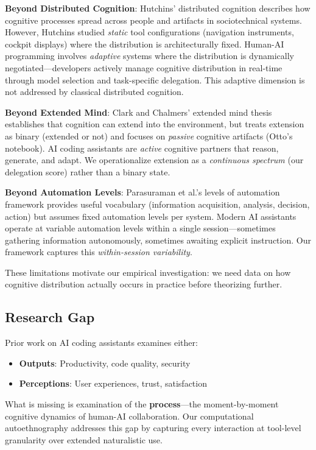\documentclass{ntlabs-preprint}
\begin{document}
\textbf{Beyond Distributed Cognition}: Hutchins' \citep{hutchins1995cognition} distributed cognition describes how cognitive processes spread across people and artifacts in sociotechnical systems. However, Hutchins studied \textit{static} tool configurations (navigation instruments, cockpit displays) where the distribution is architecturally fixed. Human-AI programming involves \textit{adaptive} systems where the distribution is dynamically negotiated---developers actively manage cognitive distribution in real-time through model selection and task-specific delegation. This adaptive dimension is not addressed by classical distributed cognition.

\textbf{Beyond Extended Mind}: Clark and Chalmers' \citep{clark1998extended} extended mind thesis establishes that cognition can extend into the environment, but treats extension as binary (extended or not) and focuses on \textit{passive} cognitive artifacts (Otto's notebook). AI coding assistants are \textit{active} cognitive partners that reason, generate, and adapt. We operationalize extension as a \textit{continuous spectrum} (our delegation score) rather than a binary state.

\textbf{Beyond Automation Levels}: Parasuraman et al.'s \citep{parasuraman2000model} levels of automation framework provides useful vocabulary (information acquisition, analysis, decision, action) but assumes fixed automation levels per system. Modern AI assistants operate at variable automation levels within a single session---sometimes gathering information autonomously, sometimes awaiting explicit instruction. Our framework captures this \textit{within-session variability}.

These limitations motivate our empirical investigation: we need data on how cognitive distribution actually occurs in practice before theorizing further.

\subsection{Research Gap}

Prior work on AI coding assistants examines either:
\begin{itemize}
    \item \textbf{Outputs}: Productivity, code quality, security
    \item \textbf{Perceptions}: User experiences, trust, satisfaction
\end{itemize}

What is missing is examination of the \textbf{process}---the moment-by-moment cognitive dynamics of human-AI collaboration. Our computational autoethnography addresses this gap by capturing every interaction at tool-level granularity over extended naturalistic use.
\end{document}
